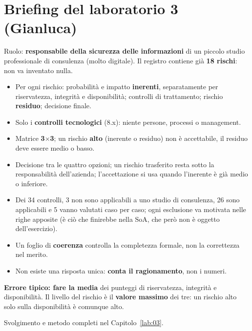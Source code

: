 \section{Briefing del laboratorio 3 (Gianluca)}
Ruolo: \textbf{responsabile della sicurezza delle informazioni} di un piccolo studio professionale di
consulenza (molto digitale). Il registro contiene già \textbf{18 rischi}: non va inventato nulla.
\begin{itemize}
  \item Per ogni rischio: probabilità e impatto \textbf{inerenti}, separatamente per riservatezza,
    integrità e disponibilità; controlli di trattamento; rischio \textbf{residuo}; decisione finale.
  \item Solo i \textbf{controlli tecnologici} (8.x): niente persone, processi o management.
  \item Matrice \textbf{3$\times$3}; un rischio \textbf{alto} (inerente o residuo) non è accettabile, il
    residuo deve essere medio o basso.
  \item Decisione tra le quattro opzioni; un rischio trasferito resta sotto la responsabilità dell'azienda;
    l'accettazione si usa quando l'inerente è già medio o inferiore.
  \item Dei 34 controlli, 3 non sono applicabili a uno studio di consulenza, 26 sono applicabili e 5 vanno
    valutati caso per caso; ogni esclusione va motivata nelle righe apposite (è ciò che finirebbe nella
    SoA, che però non è oggetto dell'esercizio).
  \item Un foglio di \textbf{coerenza} controlla la completezza formale, non la correttezza nel merito.
  \item Non esiste una risposta unica: \textbf{conta il ragionamento}, non i numeri.
\end{itemize}

\begin{esame}
\textbf{Errore tipico: fare la media} dei punteggi di riservatezza, integrità e disponibilità. Il livello
del rischio è il \textbf{valore massimo} dei tre: un rischio alto solo sulla disponibilità è comunque alto.
\end{esame}

\noindent Svolgimento e metodo completi nel Capitolo~\ref{lab:03}.

